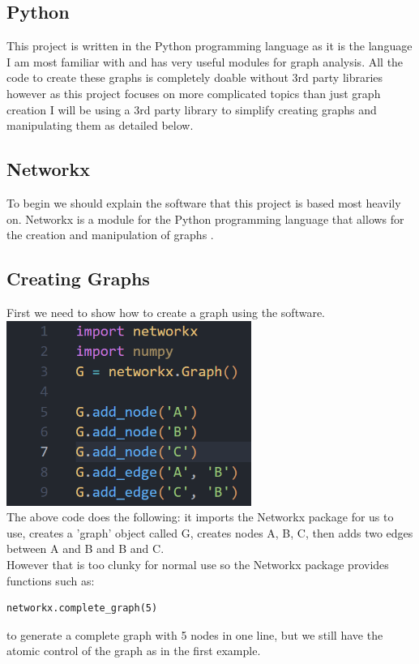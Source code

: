 \documentclass{article}
\begin{document}
        \subsection{Python}
        This project is written in the Python programming language as it is the language I am most familiar with and has very useful modules for graph analysis. All the code to create these graphs is completely doable without 3rd party libraries however as this project focuses on more complicated topics than just graph creation I will be using a 3rd party library to simplify creating graphs and manipulating them as detailed below.
        \subsection{Networkx}
        To begin we should explain the software that this project is based most heavily on. Networkx is a module for the Python programming language that allows for the creation and manipulation of graphs \parencite{SciPyProceedings_11}.
        \subsection{Creating Graphs}
        First we need to show how to create a graph using the software.\\
        \includegraphics[width=8cm]{images/add_nodes_add_edges.png}\\
        The above code does the following: it imports the Networkx package for us to use, creates a 'graph' object called G, creates nodes A, B, C, then adds two edges between A and B and B and C.\\
        However that is too clunky for normal use so the Networkx package provides functions such as:
        \begin{verbatim}networkx.complete_graph(5)\end{verbatim}
        to generate a complete graph with 5 nodes in one line, but we still have the atomic control of the graph as in the first example.
\end{document}
